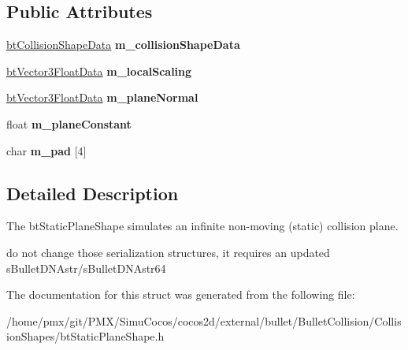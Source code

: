 \subsection*{Public Attributes}
\begin{DoxyCompactItemize}
\item 
\mbox{\label{structbtStaticPlaneShapeData_acda49bbbfb84ecf1ef04488927dfbc6a}} 
\hyperlink{structbtCollisionShapeData}{bt\+Collision\+Shape\+Data} {\bfseries m\+\_\+collision\+Shape\+Data}
\item 
\mbox{\label{structbtStaticPlaneShapeData_a25b5dddfd3f4d064726e98d50fe5f514}} 
\hyperlink{structbtVector3FloatData}{bt\+Vector3\+Float\+Data} {\bfseries m\+\_\+local\+Scaling}
\item 
\mbox{\label{structbtStaticPlaneShapeData_af744597a06773b77870eb6f916b73a32}} 
\hyperlink{structbtVector3FloatData}{bt\+Vector3\+Float\+Data} {\bfseries m\+\_\+plane\+Normal}
\item 
\mbox{\label{structbtStaticPlaneShapeData_a182b2ddfaa9efb2235df867f3bb9a2e1}} 
float {\bfseries m\+\_\+plane\+Constant}
\item 
\mbox{\label{structbtStaticPlaneShapeData_a78a8bb9157ab78b228cdfa88b39bb698}} 
char {\bfseries m\+\_\+pad} \mbox{[}4\mbox{]}
\end{DoxyCompactItemize}


\subsection{Detailed Description}
The bt\+Static\+Plane\+Shape simulates an infinite non-\/moving (static) collision plane. 

do not change those serialization structures, it requires an updated s\+Bullet\+D\+N\+Astr/s\+Bullet\+D\+N\+Astr64 

The documentation for this struct was generated from the following file\+:\begin{DoxyCompactItemize}
\item 
/home/pmx/git/\+P\+M\+X/\+Simu\+Cocos/cocos2d/external/bullet/\+Bullet\+Collision/\+Collision\+Shapes/bt\+Static\+Plane\+Shape.\+h\end{DoxyCompactItemize}

